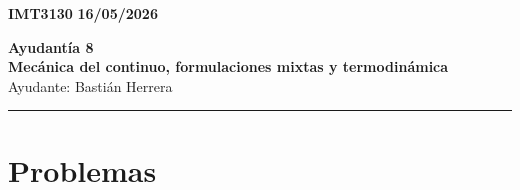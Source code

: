 \documentclass[11pt]{article}
\begin{document}
\begin{flushleft}
    \small
    \textbf{IMT3130} \hfill
    \textbf{16/05/2026}
\end{flushleft}
\begin{center}
    \LARGE\textbf{Ayudant\'ia 8}\\
    \vspace{3pt}
    \normalsize\textbf{Mec\'anica del continuo, formulaciones mixtas y termodin\'amica}\\
    \normalsize Ayudante: Basti\'an Herrera 
    \rule{\textwidth}{0.05mm}
\end{center}

\section*{Problemas}
\end{document}
